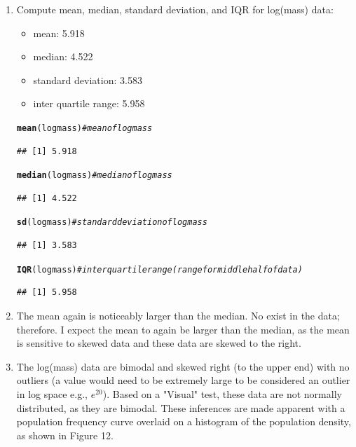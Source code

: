 \documentclass{article}\usepackage[]{graphicx}\usepackage[]{color}
\makeatletter
\newcommand{\hlcom}[1]{\textcolor[rgb]{0.678,0.584,0.686}{\textit{#1}}}%
\newcommand{\hlstd}[1]{\textcolor[rgb]{0.345,0.345,0.345}{#1}}%
\newcommand{\hlkwd}[1]{\textcolor[rgb]{0.737,0.353,0.396}{\textbf{#1}}}%
\newenvironment{kframe}{%
 \def\at@end@of@kframe{}%
 \ifinner\ifhmode%
  \def\at@end@of@kframe{\end{minipage}}%
  \begin{minipage}{\columnwidth}%
 \fi\fi%
 \def\FrameCommand##1{\hskip\@totalleftmargin \hskip-\fboxsep
 \colorbox{shadecolor}{##1}\hskip-\fboxsep
     \hskip-\linewidth \hskip-\@totalleftmargin \hskip\columnwidth}%
 \MakeFramed {\advance\hsize-\width
   \@totalleftmargin\z@ \linewidth\hsize
   \@setminipage}}%
 {\par\unskip\endMakeFramed%
 \at@end@of@kframe}
\newenvironment{knitrout}{}{} %
\makeatother
\begin{document}
\begin{enumerate}
\begin{enumerate}
      \item Compute mean, median, standard deviation, and IQR for log(mass) data:
        \begin{itemize}
          \item mean: 5.918
          \item median:  4.522
          \item standard deviation:  3.583
          \item inter quartile range:  5.958
        \end{itemize}
\begin{knitrout}
\color{fgcolor}\begin{kframe}
\begin{alltt}
\hlkwd{mean}\hlstd{(logmass)}    \hlcom{# mean of logmass}
\end{alltt}
\begin{verbatim}
## [1] 5.918
\end{verbatim}
\begin{alltt}
\hlkwd{median}\hlstd{(logmass)}  \hlcom{# median of logmass}
\end{alltt}
\begin{verbatim}
## [1] 4.522
\end{verbatim}
\begin{alltt}
\hlkwd{sd}\hlstd{(logmass)}      \hlcom{# standard deviation of logmass}
\end{alltt}
\begin{verbatim}
## [1] 3.583
\end{verbatim}
\begin{alltt}
\hlkwd{IQR}\hlstd{(logmass)}     \hlcom{# inter quartile range (range for middle half of data)}
\end{alltt}
\begin{verbatim}
## [1] 5.958
\end{verbatim}
\end{kframe}
\end{knitrout}

      \item The mean again is noticeably larger than the median.  No
      exist in the data; therefore.  I expect the mean to again
      be larger than the median, as the mean is sensitive to skewed data and these
      data are skewed to the right.

      \item The log(mass) data are bimodal and skewed right (to the upper end)
        with no outliers (a value would need to be extremely large to be considered
        an outlier in log space e.g., $e^{20}$).
        Based on a "Visual" test, these data are not normally
        distributed, as they are bimodal.
        These inferences are made apparent with a population frequency curve overlaid
        on a histogram of the population density, as shown in Figure 12.




\end{enumerate}
\end{enumerate}
\end{document}
